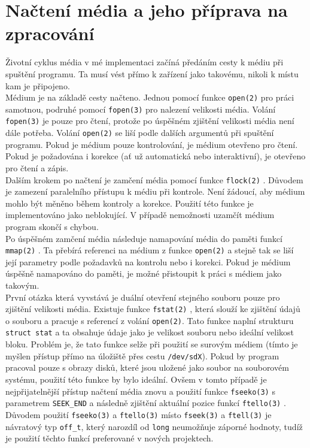 \section{Načtení média a jeho příprava na zpracování}
Životní cyklus média v mé implementaci začíná předáním cesty k médiu při spuštění programu. Ta musí vést přímo k zařízení jako takovému, nikoli k místu kam je připojeno.\\
Médium je na základě cesty načteno. Jednou pomocí funkce \texttt{open(2)} \cite{man-open} pro práci samotnou, podruhé pomocí \texttt{fopen(3)} \cite{man-fopen} pro nalezení velikosti média. Volání \texttt{fopen(3)} je pouze pro čtení, protože po úspěšném zjištění velikosti média není dále potřeba. Volání \texttt{open(2)} se liší podle dalších argumentů při spuštění programu. Pokud je médium pouze kontrolování, je médium otevřeno pro čtení. Pokud je požadována i korekce (ať už automatická nebo interaktivní), je otevřeno pro čtení a zápis.\\
Dalším krokem po načtení je zamčení média pomocí funkce \texttt{flock(2)} \cite{man-flock}. Důvodem je zamezení paralelního přístupu k médiu při kontrole. Není žádoucí, aby médium mohlo být měněno během kontroly a korekce. Použití této funkce je implementováno jako neblokující. V případě nemožnosti uzamčít médium program skončí s chybou.\\
Po úspěšném zamčení média následuje namapování média do paměti funkcí \texttt{mmap(2)} \cite{man-mmap}. Ta přebírá referenci na médium z funkce \texttt{open(2)} a stejně tak se liší její parametry podle požadavků na kontrolu nebo i korekci. Pokud je médium úspěšně namapováno do paměti, je možné přistoupit k práci s médiem jako takovým.\\
První otázka která vyvstává je duální otevření stejného souboru pouze pro zjištění velikosti média. Existuje funkce \texttt{fstat(2)} \cite{man-fstat}, která slouží ke zjištění údajů o souboru a pracuje s referencí z volání \texttt{open(2)}. Tato funkce naplní strukturu \texttt{struct stat} a ta obsahuje údaje jako je velikost souboru nebo ideální velikost bloku. Problém je, že tato funkce selže při použití se surovým médiem (tímto je myšlen přístup přímo na úložiště přes cestu \texttt{/dev/sdX}). Pokud by program pracoval pouze s obrazy disků, které jsou uložené jako soubor na souborovém systému, použití této funkce by bylo ideální. Ovšem v tomto případě je nejpřijatelnější přístup načtení média znovu a použití funkce \texttt{fseeko(3)} \cite{man-fseeko} s parametrem \texttt{SEEK\_END} a následně zjištění aktuální pozice funkcí \texttt{ftello(3)} \cite{man-ftello}. Důvodem použití \texttt{fseeko(3)} a \texttt{ftello(3)} místo \texttt{fseek(3)} \cite{man-fseek} a \texttt{ftell(3)} \cite{man-ftell} je návratový typ \texttt{off\_t}, který narozdíl od \texttt{long} neumožňuje záporné hodnoty, tudíž je použití těchto funkcí preferované v nových projektech.\\

